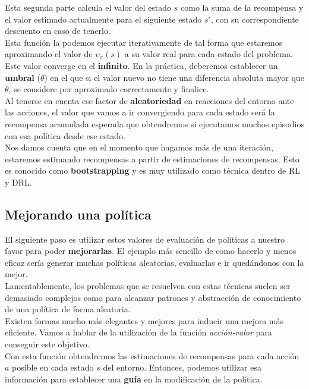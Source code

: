 \documentclass[11pt,fleqn]{book} %
\begin{document}
Esta segunda parte calcula el valor del estado $s$ como la suma de la recompensa y el valor estimado actualmente para el siguiente estado $s'$, con su correspondiente descuento en caso de tenerlo. \\

Esta función la podemos ejecutar iterativamente de tal forma que estaremos aproximando el valor de $\upsilon_\pi(s)$ a su valor real para cada estado del problema. Este valor converge en el \textbf{infinito}. En la práctica, deberemos establecer un \textbf{umbral} ($\theta$) en el que si el valor nuevo no tiene una diferencia absoluta mayor que $\theta$, se considere por aproximado correctamente y finalice. \\

Al tenerse en cuenta ese factor de \textbf{aleatoriedad} en reacciones del entorno ante las acciones, el valor que vamos a ir convergiendo para cada estado será la recompensa acumulada esperada que obtendremos si ejecutamos muchos episodios con esa política desde ese estado. \\

Nos damos cuenta que en el momento que hagamos más de una iteración, estaremos estimando recompensas a partir de estimaciones de recompensas. Esto es conocido como \textbf{bootstrapping} y es muy utilizado como técnica dentro de RL y DRL.

\subsection{Mejorando una política}

El siguiente paso es utilizar estos valores de evaluación de políticas a nuestro favor para poder \textbf{mejorarlas}. El ejemplo más sencillo de como hacerlo y menos eficaz sería generar muchas políticas aleatorias, evaluarlas e ir quedándonos con la mejor. \\

Lamentablemente, los problemas que se resuelven con estas técnicas suelen ser demasiado complejos como para alcanzar patrones y abstracción de conocimiento de una política de forma aleatoria. \\

Existen formas mucho más elegantes y mejores para inducir una mejora más eficiente. Vamos a hablar de la utilización de la función \textit{acción-valor} para conseguir este objetivo. \\

Con esta función obtendremos las estimaciones de recompensas para cada acción $a$ posible en cada estado $s$ del entorno. Entonces, podemos utilizar esa información para establecer una \textbf{guía} en la modificación de la política. \\
\end{document}
